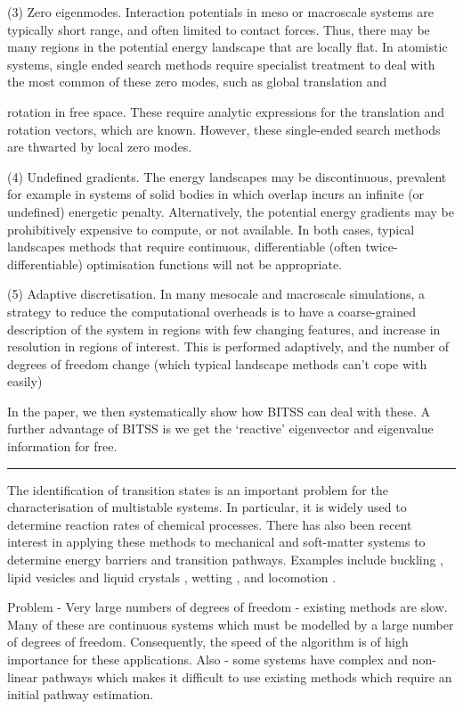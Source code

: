 \documentclass[aps,twocolumn]{revtex4}
\begin{document}
(3) Zero eigenmodes. Interaction potentials in meso or macroscale systems are typically short range, and often limited to contact forces. Thus, there may be many regions in the potential energy landscape that are locally flat. In atomistic systems, single ended search methods require specialist treatment to deal with the most common of these zero modes, such as global translation and

rotation in free space. These require analytic expressions for the translation and rotation vectors, which are known. However, these single-ended search methods are thwarted by local zero modes.

(4) Undefined gradients. The energy landscapes may be discontinuous, prevalent for example in systems of solid bodies in which overlap incurs an infinite (or undefined) energetic penalty. Alternatively, the potential energy gradients may be prohibitively expensive to compute, or not available. In both cases, typical landscapes methods that require continuous, differentiable (often twice-differentiable) optimisation functions will not be appropriate.

(5) Adaptive discretisation. In many mesocale and macroscale simulations, a strategy to reduce the computational overheads is to have a coarse-grained description of the system in regions with few changing features, and increase in resolution in regions of interest. This is performed adaptively, and the number of degrees of freedom change (which typical landscape methods can’t cope with easily)

In the paper, we then systematically show how BITSS can deal with these. A further advantage of BITSS is we get the ‘reactive’ eigenvector and eigenvalue information for free.

\begin{center}
\rule{3cm}{0.2pt}
\end{center}

The identification of transition states is an important problem for the characterisation of multistable systems. In particular, it is widely used to determine reaction rates of chemical processes. There has also been recent interest in applying these methods to mechanical and soft-matter systems to determine energy barriers and transition pathways. Examples include buckling \cite{Panter2019,Hutchinson2018}, lipid vesicles and liquid crystals \cite{Kusumaatmaja2015}, wetting \cite{Panter2019b,Zhang2014}, and locomotion \cite{Othayoth2020}.

Problem - Very large numbers of degrees of freedom - existing methods are slow.
Many of these are continuous systems which must be modelled by a large number of degrees of freedom. Consequently, the speed of the algorithm is of high importance for these applications.
Also - some systems have complex and non-linear pathways which makes it difficult to use existing methods which require an initial pathway estimation.
\end{document}
